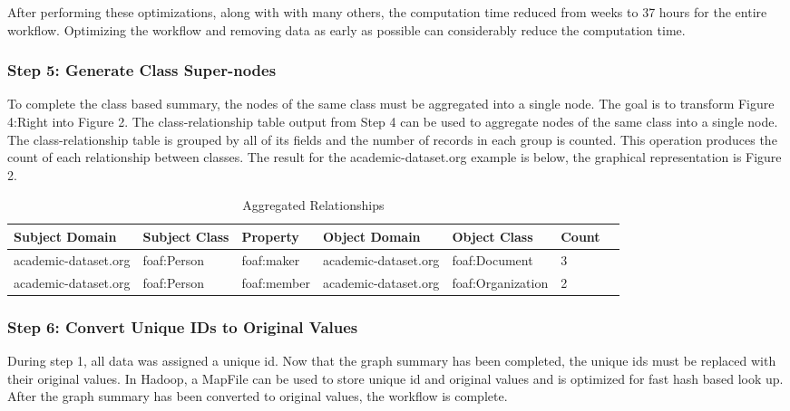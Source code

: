 \documentclass[11pt,onecolumn]{article}
\begin{document}
After performing these optimizations, along with with many others, the computation time reduced from weeks to 37 hours for the entire workflow.  Optimizing the workflow and removing data as early as possible can considerably reduce the computation time. 

\subsubsection{Step 5: Generate Class Super-nodes} 
To complete the class based summary, the nodes of the same class must be aggregated into a single node.  The goal is to transform Figure 4:Right into Figure 2. The class-relationship table output from Step 4 can be used to aggregate nodes of the same class into a single node.  The class-relationship table is grouped by all of its fields and the number of records in each group is counted. This operation produces the count of each relationship between classes.  The result for the academic-dataset.org example is below, the graphical representation is Figure 2.


\begin{table}[h!]
\begin{center}
  \begin{tabular}{| l | l | l | l | l | l | r | }
    \hline
    {\bf Subject Domain} & {\bf Subject Class} & {\bf Property} & {\bf Object Domain} & {\bf Object Class} & {\bf Count}  \\ \hline    
    academic-dataset.org & foaf:Person & foaf:maker & academic-dataset.org & foaf:Document & 3  \\ \hline
    academic-dataset.org & foaf:Person & foaf:member & academic-dataset.org & foaf:Organization & 2  \\ \hline
  \end{tabular}
\end{center}
\caption{Aggregated Relationships}
\end{table}

\subsubsection{Step 6: Convert Unique IDs to Original Values}
During step 1, all data was assigned a unique id.  Now that the graph summary has been completed, the unique ids must be replaced with their original values.  In Hadoop, a MapFile can be used to store unique id and original values and is optimized for fast hash based look up.  After the graph summary has been converted to original values, the workflow is complete.
\end{document}
